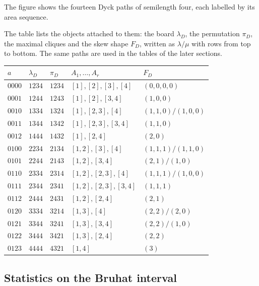 \begin{example*}\label{dyckPathSemilengthFour}
The figure shows the fourteen Dyck paths of semilength four, each labelled by
its area sequence.
\begin{figure}
\end{figure}

The table lists the objects attached to them: the board
$\lambda_D$, the permutation $\pi_D$, the maximal cliques and the skew shape
$F_D$, written as $\lambda/\mu$ with rows from top to bottom.  The same paths
are used in the tables of the later sections.

\begin{tabular}{lllll}
\toprule
$a$ & $\lambda_D$ & $\pi_D$ & $A_1,\dotsc,A_r$ & $F_D$ \\
\midrule
$0000$ & $1234$ & $1234$ & $[1],[2],[3],[4]$ & $(0,0,0,0)$ \\
$0001$ & $1244$ & $1243$ & $[1],[2],[3,4]$ & $(1,0,0)$ \\
$0010$ & $1334$ & $1324$ & $[1],[2,3],[4]$ & $(1,1,0)/(1,0,0)$ \\
$0011$ & $1344$ & $1342$ & $[1],[2,3],[3,4]$ & $(1,1,0)$ \\
$0012$ & $1444$ & $1432$ & $[1],[2,4]$ & $(2,0)$ \\
$0100$ & $2234$ & $2134$ & $[1,2],[3],[4]$ & $(1,1,1)/(1,1,0)$ \\
$0101$ & $2244$ & $2143$ & $[1,2],[3,4]$ & $(2,1)/(1,0)$ \\
$0110$ & $2334$ & $2314$ & $[1,2],[2,3],[4]$ & $(1,1,1)/(1,0,0)$ \\
$0111$ & $2344$ & $2341$ & $[1,2],[2,3],[3,4]$ & $(1,1,1)$ \\
$0112$ & $2444$ & $2431$ & $[1,2],[2,4]$ & $(2,1)$ \\
$0120$ & $3334$ & $3214$ & $[1,3],[4]$ & $(2,2)/(2,0)$ \\
$0121$ & $3344$ & $3241$ & $[1,3],[3,4]$ & $(2,2)/(1,0)$ \\
$0122$ & $3444$ & $3421$ & $[1,3],[2,4]$ & $(2,2)$ \\
$0123$ & $4444$ & $4321$ & $[1,4]$ & $(3)$ \\
\bottomrule
\end{tabular}
\end{example*}


\subsection[dyckPathBruhatPolynomials]{Statistics on the Bruhat interval}

